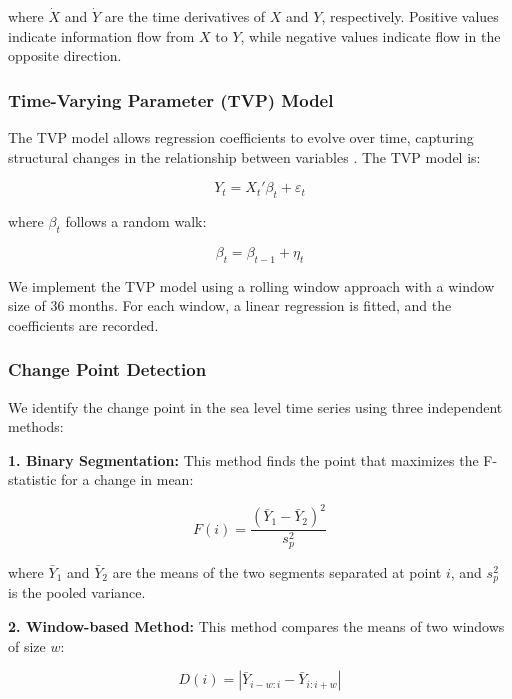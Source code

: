 \documentclass[12pt,a4paper,twocolumn]{article}
\begin{document}
where $\dot{X}$ and $\dot{Y}$ are the time derivatives of $X$ and $Y$, respectively. Positive values indicate information flow from $X$ to $Y$, while negative values indicate flow in the opposite direction.

\subsubsection{Time-Varying Parameter (TVP) Model}

The TVP model allows regression coefficients to evolve over time, capturing structural changes in the relationship between variables \citep{primiceri2005}. The TVP model is:

\begin{equation}
Y_t = X_t' \beta_t + \varepsilon_t
\end{equation}

where $\beta_t$ follows a random walk:

\begin{equation}
\beta_t = \beta_{t-1} + \eta_t
\end{equation}

We implement the TVP model using a rolling window approach with a window size of 36 months. For each window, a linear regression is fitted, and the coefficients are recorded.

\subsubsection{Change Point Detection}

We identify the change point in the sea level time series using three independent methods:

\textbf{1. Binary Segmentation:} This method finds the point that maximizes the F-statistic for a change in mean:

\begin{equation}
F(i) = \frac{(\bar{Y}_1 - \bar{Y}_2)^2}{s_p^2}
\end{equation}

where $\bar{Y}_1$ and $\bar{Y}_2$ are the means of the two segments separated at point $i$, and $s_p^2$ is the pooled variance.

\textbf{2. Window-based Method:} This method compares the means of two windows of size $w$:

\begin{equation}
D(i) = |\bar{Y}_{i-w:i} - \bar{Y}_{i:i+w}|
\end{equation}
\end{document}
